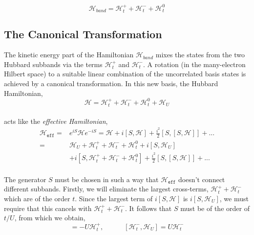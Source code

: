 \documentclass{article}
\begin{document}
\begin{equation}
\mathcal{H}_{band} = \mathcal{H}_{t}^{+} + \mathcal{H}_{t}^{-}+ \mathcal{H}_{t}^{0}
\end{equation}

\subsection{The Canonical Transformation}

The kinetic energy part of the Hamiltonian $\mathcal{H}_{band}$ mixes the states from the two Hubbard subbands via the terms  $\mathcal{H}_{t}^{+}$ and $\mathcal{H}_{t}^{-}$. A rotation (in the many-electron Hilbert space) to a suitable linear combination of the uncorrelated basis states is achieved by a canonical transformation. In this new basis, the Hubbard Hamiltonian,
\\
\begin{equation}
\mathcal{H} = \mathcal{H}_{t}^{+} + \mathcal{H}_{t}^{-}+ \mathcal{H}_{t}^{0} + \mathcal{H}_{U}
\end{equation} 
\\
acts like the \textit{effective Hamiltonian},
\\
\begin{equation}
\begin{split}
\mathcal{H}_{\texttt{eff}} =  & e^{iS} \mathcal{H} e^{-iS} = \mathcal{H} + i[S, \mathcal{H}] + \frac{i^2}{2} [S, [S,\mathcal{H}]] + ...\\
=  & \mathcal{H}_U + \mathcal{H}_{t}^{+} + \mathcal{H}_{t}^{-} + \mathcal{H}_{t}^{0} + i[S, \mathcal{H}_U]\\
   &+ i[S, \mathcal{H}_{t}^{+} + \mathcal{H}_{t}^{-}+ \mathcal{H}_{t}^{0}] + \frac{i^2}{2} [S, [S,\mathcal{H}]] + ...
\end{split}
\end{equation}
\\
The generator $S$ must be chosen in such a way that $\mathcal{H}_{\texttt{eff}}$ doesn't connect different subbands. Firstly, we will eliminate the largest cross-terms, $\mathcal{H}_{t}^{+} + \mathcal{H}_{t}^{-}$ which are of the order $t$. Since the largest term of $i[S, \mathcal{H}] $ is $i[S, \mathcal{H}_U] $, we must require that this cancels with $\mathcal{H}_{t}^{+} + \mathcal{H}_{t}^{-}$. It follows that $S$ must be of the order of $t/U$, from which we obtain, 
\\
\begin{equation}
[\mathcal{H}_{t}^{+}, \mathcal{H}_U] = -U\mathcal{H}_{t}^{+},  \quad \quad \quad  [\mathcal{H}_{t}^{-}, \mathcal{H}_U] = U\mathcal{H}_{t}^{-}
\end{equation}
\end{document}
